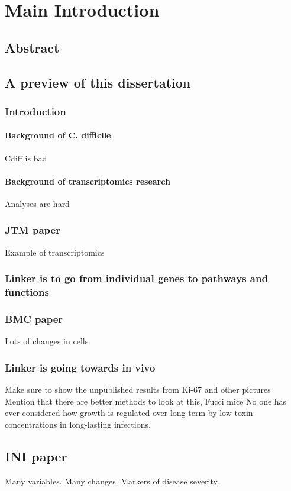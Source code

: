
\chapter{Main Introduction}\label{chapter:intro1}

\section{Abstract}

\section{A preview of this dissertation}

\subsection{Introduction}
\subsubsection{ Background of C. difficile }
Cdiff is bad
\subsubsection{ Background of transcriptomics research }
Analyses are hard

\subsection{JTM paper}
Example of transcriptomics
\subsection{ Linker is to go from individual genes to pathways and functions }

\subsection{BMC paper}
Lots of changes in cells
\subsection{Linker is going towards in vivo}
Make sure to show the unpublished results from Ki-67 and other pictures
Mention that there are better methods to look at this, Fucci mice
No one has ever considered how growth is regulated over long term by
low toxin concentrations in long-lasting infections.

\section{INI paper}
Many variables. Many changes. Markers of disease severity.

